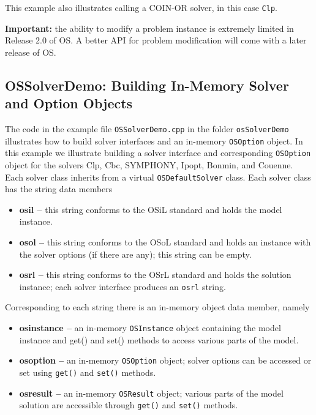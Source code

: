 \documentclass[11pt]{article}
\renewcommand{\{}{{\char"7B}}
\renewcommand{\}}{{\char"7D}}
\renewcommand{\^}{{\char"0D}}
\renewcommand{\'}{{\char"0D}}
\begin{document}
This example also illustrates calling a COIN-OR solver,
in this case {\tt Clp}.

\vskip 8pt

{\bf Important:} the ability to modify a problem instance is extremely limited in Release 2.0 of OS. 
A better API for problem modification will come with a later release of OS.



\subsection{OSSolverDemo: Building In-Memory Solver and Option Objects}\label{section:exampleOSSolverDemo}

The code in the  example file {\tt OSSolverDemo.cpp} in the folder {\tt osSolverDemo}  
illustrates  how to build solver interfaces and  an in-memory {\tt OSOption} object. 
In this example we  illustrate building a solver interface and corresponding {\tt OSOption} 
object for the solvers Clp, Cbc, SYMPHONY, Ipopt,   Bonmin, and Couenne.   
Each solver class inherits from a virtual {\tt OSDefaultSolver} class. 
Each solver class has the string data members

\begin{itemize}
\item {\bf osil --} this string conforms to the OSiL standard and holds the model instance.

\item {\bf osol --} this string conforms to the OSoL standard and holds an instance with the 
solver options (if there are any); this string can be empty.

\item {\bf osrl --} this string conforms to the OSrL standard and holds the solution instance; 
each solver interface produces an {\tt osrl} string.
\end{itemize}

Corresponding to each string there is an in-memory object data member, namely

\begin{itemize}
\item {\bf osinstance --}  an in-memory {\tt OSInstance} object containing the model instance
and get() and set() methods to access various parts of the model.


\item {\bf osoption --} an in-memory {\tt OSOption} object; solver options can be accessed or 
set using {\tt get()} and {\tt set()} methods.


\item {\bf osresult --}  an in-memory {\tt OSResult} object; various parts of the model solution  
are accessible through {\tt get()} and {\tt set()} methods.
\end{itemize}
\end{document}

